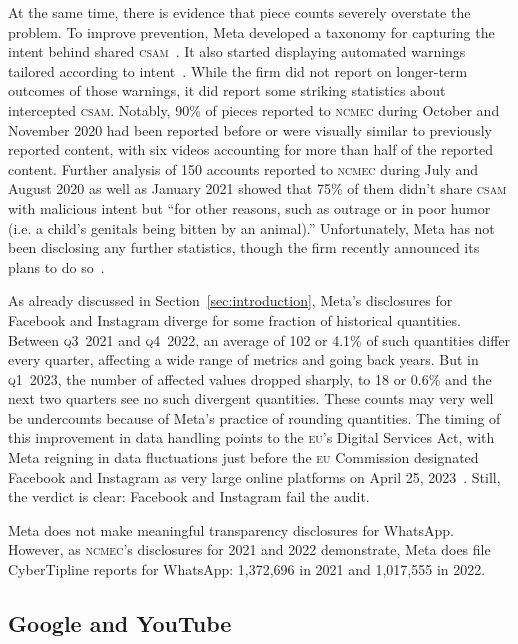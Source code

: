 \documentclass[nonacm,screen]{acmart}
\newcommand\V[1]{\textsc{\MakeLowercase{#1}}}
\begin{document}
\begin{itemize}
{At the same time, there is evidence that piece counts severely overstate the
problem. To improve prevention, Meta developed a taxonomy for capturing the
intent behind shared \V{CSAM}~\cite{BuckleyAndrusea2021}. It also started
displaying automated warnings tailored according to intent~\cite{Davis2021}.
While the firm did not report on longer-term outcomes of those warnings, it did
report some striking statistics about intercepted \V{CSAM}. Notably, 90\% of
pieces reported to \V{NCMEC} during October and November 2020 had been reported
before or were visually similar to previously reported content, with six videos
accounting for more than half of the reported content. Further analysis of 150
accounts reported to \V{NCMEC} during July and August 2020 as well as January
2021 showed that 75\% of them didn't share \V{CSAM} with malicious intent but
``for other reasons, such as outrage or in poor humor (i.e. a child's genitals
being bitten by an animal).'' Unfortunately, Meta has not been disclosing any
further statistics, though the firm recently announced its plans to do
so~\cite{Meta2023}.

As already discussed in Section~\ref{sec:introduction}, Meta's disclosures for
Facebook and Instagram diverge for some fraction of historical quantities.
Between \V{Q3}~2021 and \V{Q4}~2022, an average of 102 or 4.1\% of such
quantities differ every quarter, affecting a wide range of metrics and going
back years. But in \V{Q1}~2023, the number of affected values dropped sharply,
to 18 or 0.6\% and the next two quarters see no such divergent quantities. These
counts may very well be undercounts because of Meta's practice of rounding
quantities. The timing of this improvement in data handling points to the
\V{EU}'s Digital Services Act, with Meta reigning in data fluctuations just
before the \V{EU} Commission designated Facebook and Instagram as very large
online platforms on April 25, 2023~\cite{EuropeanCommission2023a}. Still, the
verdict is clear: Facebook and Instagram fail the audit.

Meta does not make meaningful transparency disclosures for WhatsApp. However, as
\V{NCMEC}'s disclosures for 2021 and 2022 demonstrate, Meta does file
CyberTipline reports for WhatsApp: 1,372,696 in 2021 and 1,017,555 in 2022.


\subsection{Google and YouTube}

}
\end{itemize}
\end{document}
